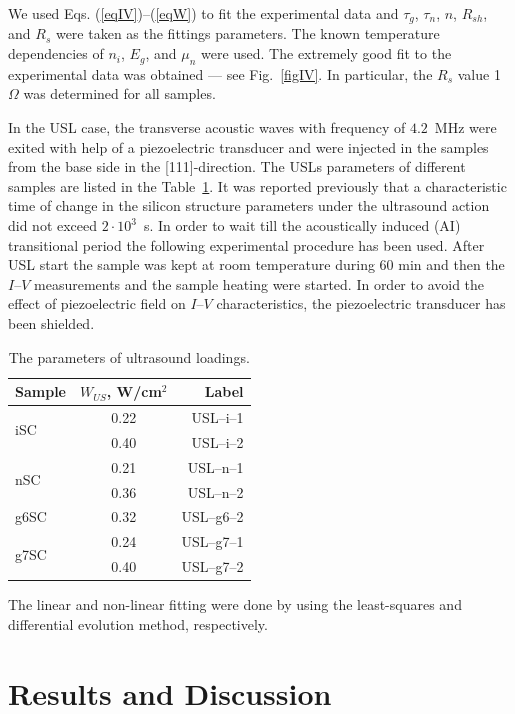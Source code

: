 \documentclass[aip,jap, amsmath,amssymb,reprint]{revtex4-1}
\begin{document}
We used Eqs. (\ref{eqIV})--(\ref{eqW}) to fit the experimental data and $\tau_g$, $\tau_n$, $n$, $R_{sh}$, and $R_s$ were taken as the  fittings parameters.
The known \cite{ni:Green,Schroder2006,Markvart} temperature dependencies of $n_i$, $E_g$, and $\mu_n$ were used.
The extremely good fit to the experimental data was obtained --- see Fig.~\ref{figIV}.
In particular, the $R_s$ value 1~$\Omega$ was determined for all samples.


In the USL case, the transverse acoustic waves with frequency of $4.2$~MHz were exited with help of a piezoelectric transducer and were injected in the samples from the base side in the [111]-direction.
The USLs parameters of different samples are listed in the Table~\ref{tabUSL}.
It was reported previously \cite{Ostapenko1995,Olikh:Ultras,Ostrovskii2001} that a characteristic time of change in the silicon structure parameters under the ultrasound action  did not exceed $2\cdot10^3$~s.
In order to wait till the acoustically induced (AI) transitional period the following experimental procedure has been used.
After USL start the sample was kept at room temperature during 60 min and then the $I$--$V$ measurements and the sample heating were started.
In order to avoid the effect of piezoelectric field on $I$--$V$ characteristics, the piezoelectric transducer has been shielded.


\begin{table}
\caption{\label{tabUSL}The parameters of ultrasound loadings.
}
\begin{ruledtabular}
\begin{tabular}{lcr}
Sample&$W_{U\!S}$, W/cm$^2$&Label\\
\hline
\multirow{2}{*}{iSC}&0.22&USL--i--1\\
&0.40&USL--i--2\\
\multirow{2}{*}{nSC}&0.21&USL--n--1\\
&0.36&USL--n--2\\
g6SC&0.32&USL--g6--2\\
\multirow{2}{*}{g7SC}&0.24&USL--g7--1\\
&0.40&USL--g7--2\\
\end{tabular}
\end{ruledtabular}
\end{table}


The linear and non-linear fitting were done by using the least-squares and differential evolution \cite{DEWang} method, respectively.


\section{Results and Discussion}
\end{document}
